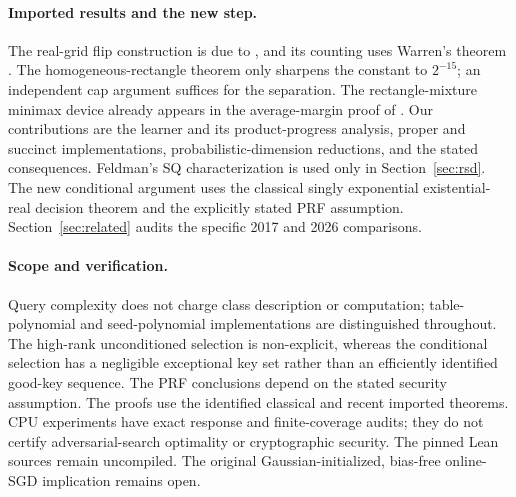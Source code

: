 \documentclass[11pt]{article}
\newcommand{\1}{\mathbf 1}
\begin{document}
\paragraph{Imported results and the new step.}
The real-grid flip construction is due to \citet{HHPTZ22}, and its counting uses Warren's theorem \citep{Warren68,AMY16}. The homogeneous-rectangle theorem \citep{APP05} only sharpens the constant to $2^{-15}$; an independent cap argument suffices for the separation. The rectangle-mixture minimax device already appears in the average-margin proof of \citet[Theorem~3.1]{HHPTZ22}. Our contributions are the learner and its product-progress analysis, proper and succinct implementations, probabilistic-dimension reductions, and the stated consequences. Feldman's SQ characterization is used only in Section~\ref{sec:rsd}. The new conditional argument uses the classical singly exponential existential-real decision theorem and the explicitly stated PRF assumption. Section~\ref{sec:related} audits the specific 2017 and 2026 comparisons.

\paragraph{Scope and verification.}
Query complexity does not charge class description or computation; table-polynomial and seed-polynomial implementations are distinguished throughout. The high-rank unconditioned selection is non-explicit, whereas the conditional selection has a negligible exceptional key set rather than an efficiently identified good-key sequence. The PRF conclusions depend on the stated security assumption. The proofs use the identified classical and recent imported theorems. CPU experiments have exact response and finite-coverage audits; they do not certify adversarial-search optimality or cryptographic security. The pinned Lean sources remain uncompiled. The original Gaussian-initialized, bias-free online-SGD implication remains open.

\end{document}
